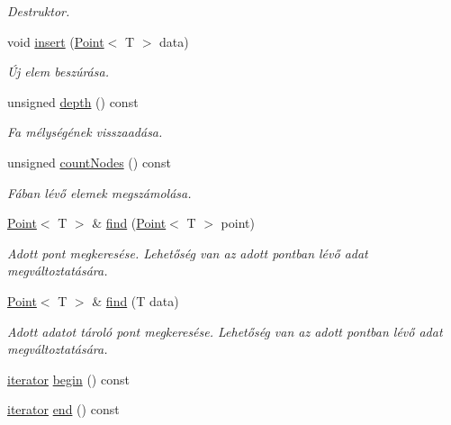 \begin{DoxyCompactItemize}
\begin{DoxyCompactList}\small\item\em Destruktor. \end{DoxyCompactList}\item 
void \hyperlink{class_quad_tree_aafef2e05b7f4bd731634574ac3bcdccc}{insert} (\hyperlink{class_point}{Point}$<$ T $>$ data)
\begin{DoxyCompactList}\small\item\em Új elem beszúrása. \end{DoxyCompactList}\item 
unsigned \hyperlink{class_quad_tree_abe41bcda41ff875907e632226bf4d244}{depth} () const 
\begin{DoxyCompactList}\small\item\em Fa mélységének visszaadása. \end{DoxyCompactList}\item 
unsigned \hyperlink{class_quad_tree_acf2697f69e5b6113d2deeb08f8022e40}{count\-Nodes} () const 
\begin{DoxyCompactList}\small\item\em Fában lévő elemek megszámolása. \end{DoxyCompactList}\item 
\hyperlink{class_point}{Point}$<$ T $>$ \& \hyperlink{class_quad_tree_a3f33d10445c05d2a45e472e800bf4207}{find} (\hyperlink{class_point}{Point}$<$ T $>$ point)
\begin{DoxyCompactList}\small\item\em Adott pont megkeresése. Lehetőség van az adott pontban lévő adat megváltoztatására. \end{DoxyCompactList}\item 
\hyperlink{class_point}{Point}$<$ T $>$ \& \hyperlink{class_quad_tree_a66d20874421d3736d491d2280ca0da65}{find} (T data)
\begin{DoxyCompactList}\small\item\em Adott adatot tároló pont megkeresése. Lehetőség van az adott pontban lévő adat megváltoztatására. \end{DoxyCompactList}\item 
\hyperlink{class_quad_tree_1_1iterator}{iterator} \hyperlink{class_quad_tree_a702aaf964efe9b2858dc223b7b810e13}{begin} () const 
\item 
\hyperlink{class_quad_tree_1_1iterator}{iterator} \hyperlink{class_quad_tree_aabea79664dba5f52adef8e977d5e3ffa}{end} () const 
\end{DoxyCompactItemize}
